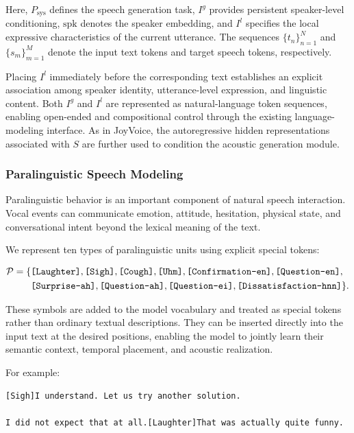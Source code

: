Here, $P_{\mathrm{sys}}$ defines the speech generation task, $I^{g}$
provides persistent speaker-level conditioning, $\mathrm{spk}$ denotes the
speaker embedding, and $I^{l}$ specifies the local expressive characteristics
of the current utterance. The sequences $\{t_n\}_{n=1}^{N}$ and
$\{s_m\}_{m=1}^{M}$ denote the input text tokens and target speech tokens,
respectively.

Placing $I^{l}$ immediately before the corresponding text establishes an
explicit association among speaker identity, utterance-level expression, and
linguistic content. Both $I^{g}$ and $I^{l}$ are represented as
natural-language token sequences, enabling open-ended and compositional control
through the existing language-modeling interface. As in JoyVoice, the
autoregressive hidden representations associated with $S$ are further used
to condition the acoustic generation module.

\subsubsection{Paralinguistic Speech Modeling}

Paralinguistic behavior is an important component of natural speech interaction. Vocal events can communicate emotion, attitude, hesitation, physical state, and conversational intent beyond the lexical meaning of the text.

We represent ten types of paralinguistic units using explicit special tokens:

\begin{equation}
\begin{split}
\mathcal{P} = \{&
\texttt{[Laughter]},
\texttt{[Sigh]},
\texttt{[Cough]},
\texttt{[Uhm]},
\texttt{[Confirmation\mbox{-}en]},
\texttt{[Question\mbox{-}en]},\\
&
\texttt{[Surprise\mbox{-}ah]},
\texttt{[Question\mbox{-}ah]},
\texttt{[Question\mbox{-}ei]},
\texttt{[Dissatisfaction\mbox{-}hnn]}
\}.
\end{split}
\end{equation}

These symbols are added to the model vocabulary and treated as special tokens rather than ordinary textual descriptions. They can be inserted directly into the input text at the desired positions, enabling the model to jointly learn their semantic context, temporal placement, and acoustic realization.

For example:

\begin{verbatim}
[Sigh]I understand. Let us try another solution.

I did not expect that at all.[Laughter]That was actually quite funny.
\end{verbatim}


